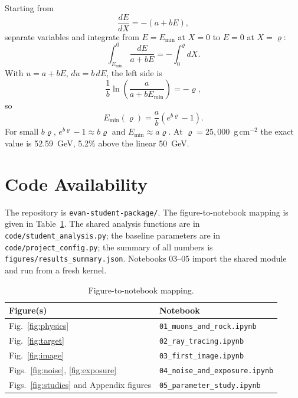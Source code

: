 \documentclass{article}
\begin{document}
Starting from
\begin{equation}
\frac{dE}{dX}=-(a+bE),
\end{equation}
separate variables and integrate from $E=E_{\min}$ at $X=0$ to $E=0$ at
$X=\varrho$:
\begin{equation}
\int_{E_{\min}}^{0}\frac{dE}{a+bE}=-\int_{0}^{\varrho}dX.
\end{equation}
With $u=a+bE$, $du=b\,dE$, the left side is
\begin{equation}
\frac{1}{b}\ln\left(\frac{a}{a+bE_{\min}}\right)=-\varrho,
\end{equation}
so
\begin{equation}
E_{\min}(\varrho)=\frac{a}{b}\left(e^{b\varrho}-1\right).
\end{equation}
For small $b\varrho$, $e^{b\varrho}-1\approx b\varrho$ and
$E_{\min}\approx a\varrho$. At $\varrho=25{,}000$~g\,cm$^{-2}$ the exact value
is 52.59~GeV, 5.2\% above the linear 50~GeV.

\section{Code Availability}
\label{app:code}

\begin{sloppypar}
The repository is \texttt{evan-student-package/}. The figure-to-notebook mapping
is given in Table~\ref{tab:code}. The shared analysis functions are in
\texttt{code/student\_analysis.py}; the baseline parameters are in
\texttt{code/project\_config.py}; the summary of all numbers is
\texttt{figures/results\_summary.json}. Notebooks 03--05 import the shared
module and run from a fresh kernel.
\end{sloppypar}

\begin{table}[h]
\centering
\caption{Figure-to-notebook mapping.}
\label{tab:code}
\small
\begin{tabular}{@{}ll@{}}
\toprule
Figure(s) & Notebook \\
\midrule
Fig.~\ref{fig:physics} & \texttt{01\_muons\_and\_rock.ipynb} \\
Fig.~\ref{fig:target} & \texttt{02\_ray\_tracing.ipynb} \\
Fig.~\ref{fig:image} & \texttt{03\_first\_image.ipynb} \\
Figs.~\ref{fig:noise}, \ref{fig:exposure} & \texttt{04\_noise\_and\_exposure.ipynb} \\
Figs.~\ref{fig:studies} and Appendix figures & \texttt{05\_parameter\_study.ipynb} \\
\bottomrule
\end{tabular}
\end{table}
\end{document}

